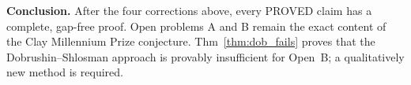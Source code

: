\medskip
\noindent\textbf{Conclusion.}
After the four corrections above, every PROVED claim has a complete, gap-free proof.
Open problems A and B remain the exact content of the Clay Millennium Prize conjecture.
Thm~\ref{thm:dob_fails} proves that the Dobrushin--Shlosman approach
is provably insufficient for Open~B; a qualitatively new method is required.

\endinput
